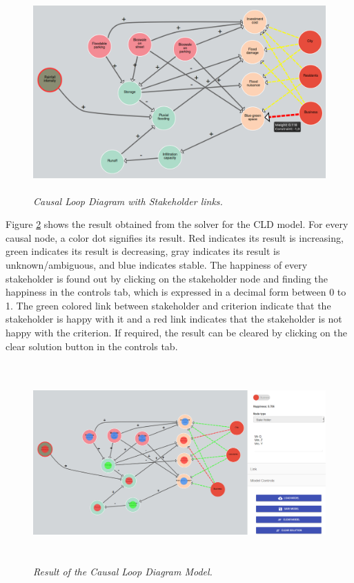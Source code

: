 \documentclass[a4paper]{article}
\begin{document}
\begin{figure}[H]
\begin{center}
\includegraphics[height=3in,width=5in]{img/cld2.png}
\caption{\small \sl Causal Loop Diagram with Stakeholder links.\label{fig:cld2}}
\end{center}
\end{figure}

Figure \ref{fig:result} shows the result obtained from the solver for the CLD model. For every causal node, a color dot signifies its result. Red indicates its result is increasing, green indicates its result is decreasing, gray indicates its result is unknown/ambiguous, and blue indicates stable. The happiness of every stakeholder is found out by clicking on the stakeholder node and finding the happiness in the controls tab, which is expressed in a decimal form between 0 to 1. The green colored link between stakeholder and criterion indicate that the stakeholder is happy with it and a red link indicates that the stakeholder is not happy with the criterion. If required, the result can be cleared by clicking on the clear solution button in the controls tab.

\begin{figure}[H]
\begin{center}
\includegraphics[height=3in,width=5in]{img/result.png}
\caption{\small \sl Result of the Causal Loop Diagram Model.\label{fig:result}}
\end{center}
\end{figure}
\end{document}
